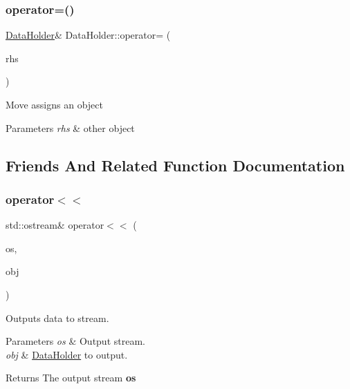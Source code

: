 \subsubsection{\texorpdfstring{operator=()}{operator=()}\hspace{0.1cm}{\footnotesize\ttfamily [2/2]}}
{\footnotesize\ttfamily \hyperlink{classDataHolder}{Data\+Holder}\& Data\+Holder\+::operator= (\begin{DoxyParamCaption}\item[{\hyperlink{classDataHolder}{Data\+Holder} \&\&}]{rhs }\end{DoxyParamCaption})\hspace{0.3cm}{\ttfamily [default]}}

Move assigns an object 
\begin{DoxyParams}{Parameters}
{\em rhs} & other object \\
\hline
\end{DoxyParams}


\subsection{Friends And Related Function Documentation}
\mbox{\label{classDataHolder_a0f981cce0bcb94e5ad04cd86a520d5bb}} 
\subsubsection{\texorpdfstring{operator$<$$<$}{operator<<}}
{\footnotesize\ttfamily std\+::ostream\& operator$<$$<$ (\begin{DoxyParamCaption}\item[{std\+::ostream \&}]{os,  }\item[{const \hyperlink{classDataHolder}{Data\+Holder} \&}]{obj }\end{DoxyParamCaption})\hspace{0.3cm}{\ttfamily [friend]}}

Outputs data to stream. 
\begin{DoxyParams}{Parameters}
{\em os} & Output stream. \\
\hline
{\em obj} & \hyperlink{classDataHolder}{Data\+Holder} to output. \\
\hline
\end{DoxyParams}
\begin{DoxyReturn}{Returns}
The output stream {\bfseries os} 
\end{DoxyReturn}
\mbox{\label{classDataHolder_ab300a1908af5ffa17e2106ce4d996fb6}} 
